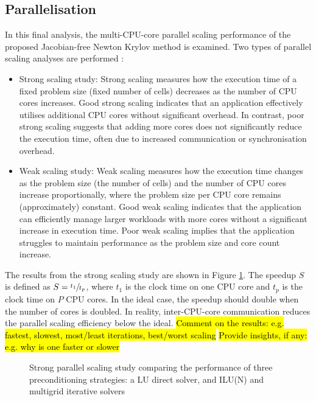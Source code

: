 \documentclass[sn-mathphys,Numbered,draft]{sn-jnl}%
\begin{document}
\subsection{Parallelisation}
\label{sec:parallelisation}
In this final analysis, the multi-CPU-core parallel scaling performance of the proposed Jacobian-free Newton Krylov method is examined.
Two types of parallel scaling analyses are performed \cite{Knoll2004}:
\begin{itemize}
	\item Strong scaling study: Strong scaling measures how the execution time of a fixed problem size (fixed number of cells) decreases as the number of CPU cores increases.
	Good strong scaling indicates that an application effectively utilises additional CPU cores without significant overhead.
	In contrast, poor strong scaling suggests that adding more cores does not significantly reduce the execution time, often due to increased communication or synchronisation overhead.

	\item Weak scaling study: Weak scaling measures how the execution time changes as the problem size (the number of cells) and the number of CPU cores increase proportionally, where the problem size per CPU core remains (approximately) constant.
	Good weak scaling indicates that the application can efficiently manage larger workloads with more cores without a significant increase in execution time.
	Poor weak scaling implies that the application struggles to maintain performance as the problem size and core count increase.
\end{itemize}

The results from the strong scaling study are shown in Figure \ref{fig:parallelisation_strong}.
The speedup $S$ is defined as $S = \sfrac{t_1}{t_p}$, where $t_1$ is the clock time on one CPU core and $t_p$ is the clock time on $P$ CPU cores.
In the ideal case, the speedup should double when the number of cores is doubled.
In reality, inter-CPU-core communication reduces the parallel scaling efficiency below the ideal.
\hl{Comment on the results: e.g. fastest, slowest, most/least iterations, best/worst scaling}
\hl{Provide insights, if any: e.g. why is one faster or slower}
\begin{figure}[htbp]
	\centering
	\caption{Strong parallel scaling study comparing the performance of three preconditioning strategies: a LU direct solver, and ILU(N) and multigrid iterative solvers}
	\label{fig:parallelisation_strong}
\end{figure}
\end{document}
